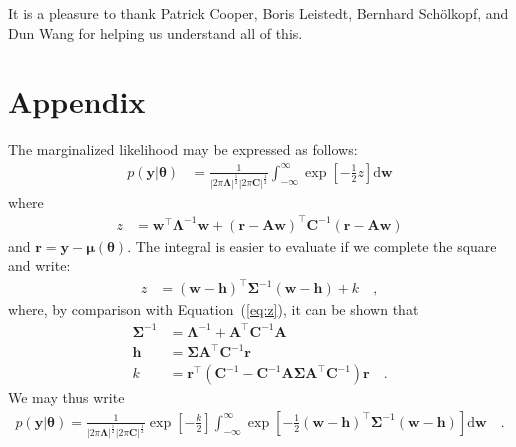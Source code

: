 \documentclass[modern]{rnaastex}
\renewcommand{\eqref}[1]{\ref{eq:#1}}
\newcommand{\Eq}[1]{Equation~(\eqref{#1})}
\newcommand{\eq}[1]{\Eq{#1}}
\newcommand{\eqlabel}[1]{\label{eq:#1}}
\newcommand{\dd}{\ensuremath{ \mathrm{d}}}
\newcommand{\bvec}[1]{{\ensuremath{\boldsymbol{#1}}}}
\newcommand{\mA}{\ensuremath{\bvec{A}}}
\newcommand{\mC}{\ensuremath{\bvec{C}}}
\newcommand{\mS}{\ensuremath{\bvec{\Sigma}}}
\newcommand{\mL}{\ensuremath{\bvec{\Lambda}}}
\newcommand{\vw}{\ensuremath{\bvec{w}}}
\newcommand{\vy}{\ensuremath{\bvec{y}}}
\newcommand{\vt}{\ensuremath{\bvec{\theta}}}
\newcommand{\vm}{\ensuremath{\bvec{\mu}(\bvec{\theta})}}
\newcommand{\vre}{\ensuremath{\bvec{r}}}
\newcommand{\vh}{\ensuremath{\bvec{h}}}
\begin{document}
\acknowledgements
It is a pleasure to thank
  Patrick Cooper,
  Boris Leistedt,
  Bernhard Sch\"olkopf, and
  Dun Wang
for helping us understand all of this.



\section{Appendix}

The marginalized likelihood may be expressed as follows:
\begin{align}
\eqlabel{integral}
p(\vy | \vt) &= \frac{1}{|2\pi\mL|^\frac{1}{2} |2\pi\mC|^\frac{1}{2}}
                \int_{-\infty}^{\infty} \exp \left[ -\frac{1}{2} z \right] \dd\vw
\end{align}
%
where
%
\begin{align}
\eqlabel{z}
z &= \vw^\top \mL^{-1} \vw + (\vre - \mA \vw)^\top \mC^{-1} (\vre - \mA \vw)
\end{align}
%
and $\vre = \vy - \vm$.
%
The integral is easier to evaluate if we
complete the square and write:
%
\begin{align}
\eqlabel{z_square}
z &= (\vw - \vh)^\top \mS^{-1} (\vw - \vh) + k \quad,
\end{align}
%
where, by comparison with \eq{z}, it can be shown that
%
\begin{align}
\mS^{-1} &= \mL^{-1} + \mA^\top \mC^{-1} \mA \\
%
\vh &= \bvec{\Sigma} \mA^\top \mC^{-1} \vre \\
%
k &= \vre^\top \left( \mC^{-1} - \mC^{-1} \mA \mS \mA^\top \mC^{-1} \right) \vre
    \quad.
\end{align}
%
We may thus write
%
\begin{align}
\eqlabel{p(y|t)ugly}
p(\vy | \vt) = \frac{1}{
                |2\pi\mL|^\frac{1}{2}
                |2\pi\mC|^\frac{1}{2}}
                \exp \left[ -\frac{k}{2} \right]
                \int_{-\infty}^{\infty} \exp
                \left[-\frac{1}{2}(\vw - \vh)^\top \mS^{-1} (\vw - \vh)
                \right] \dd\vw \quad.
\end{align}
\end{document}
